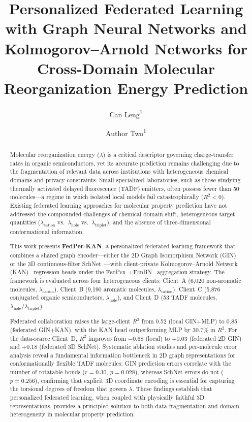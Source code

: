 \documentclass[twocolumn]{article}
\title{Personalized Federated Learning with Graph Neural Networks and Kolmogorov--Arnold Networks for Cross-Domain Molecular Reorganization Energy Prediction}
\author{
  Can Leng\textsuperscript{1} %
  \and Author Two\textsuperscript{1} %
}
\date{}
\newcommand{\lam}{\lambda}
\newcommand{\lamhole}{\lambda_{\text{hole}}}
\newcommand{\lamcat}{\lambda_{\text{cation}}}
\newcommand{\lamtrip}{\lambda_{\text{triplet}}}
\newcommand{\Rsq}{R^{2}}
\newcommand{\FedPer}{\textsc{FedPer}}
\newcommand{\FedBN}{\textsc{FedBN}}
\begin{document}
\maketitle

\begin{abstract}
Molecular reorganization energy ($\lam$) is a critical descriptor governing charge-transfer rates in organic semiconductors, yet its accurate prediction remains challenging due to the fragmentation of relevant data across institutions with heterogeneous chemical domains and privacy constraints.
Small specialized laboratories, such as those studying thermally activated delayed fluorescence (TADF) emitters, often possess fewer than 50 molecules---a regime in which isolated local models fail catastrophically ($\Rsq < 0$).
Existing federated learning approaches for molecular property prediction have not addressed the compounded challenges of chemical domain shift, heterogeneous target quantities ($\lamcat$ vs.\ $\lamhole$ vs.\ $\lamtrip$), and the absence of three-dimensional conformational information.

This work presents \textbf{FedPer-KAN}, a personalized federated learning framework that combines a shared graph encoder---either the 2D Graph Isomorphism Network (GIN)~\cite{Xu2019_GIN} or the 3D continuous-filter SchNet~\cite{Schutt2018_SchNet}---with client-private Kolmogorov--Arnold Network (KAN)~\cite{KAN2024} regression heads under the \FedPer{}~\cite{Arivazhagan2019_FedPer}+\FedBN{}~\cite{Li2021_FedBN} aggregation strategy.
The framework is evaluated across four heterogeneous clients: Client~A (6{,}020 non-aromatic molecules, $\lamcat$), Client~B (9{,}190 aromatic molecules, $\lamcat$), Client~C (5{,}876 conjugated organic semiconductors, $\lamhole$), and Client~D (53 TADF molecules, $\lamhole / \lamtrip$).

Federated collaboration raises the large-client $\Rsq$ from 0.52 (local GIN+MLP) to 0.85 (federated GIN+KAN), with the KAN head outperforming MLP by 30.7\% in $\Rsq$.
For the data-scarce Client~D, $\Rsq$ improves from $-0.68$ (local) to $+0.03$ (federated 2D GIN) and $+0.18$ (federated 3D SchNet).
Systematic ablation studies and per-molecule error analysis reveal a fundamental information bottleneck in 2D graph representations for conformationally flexible TADF molecules: GIN prediction errors correlate with the number of rotatable bonds ($r = 0.30$, $p = 0.028$), whereas SchNet errors do not ($p = 0.256$), confirming that explicit 3D coordinate encoding is essential for capturing the torsional degrees of freedom that govern $\lam$.
These findings establish that personalized federated learning, when coupled with physically faithful 3D representations, provides a principled solution to both data fragmentation and domain heterogeneity in molecular property prediction.
\end{abstract}
\end{document}
